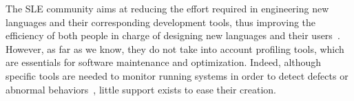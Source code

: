 
The \gls{SLE} community aims at reducing the effort required in engineering new languages and their corresponding development tools, thus improving the efficiency of both people in charge of designing new languages and their users~\cite{sle}. 
However, as far as we know, they do not take into account profiling tools, which are essentials for software maintenance and optimization.
Indeed, although specific tools are needed to monitor running systems in order to detect defects or abnormal behaviors~\cite{duesterwald2000software, Jovic:2011:CMY:2076021.2048081},
little support exists to ease their creation.


